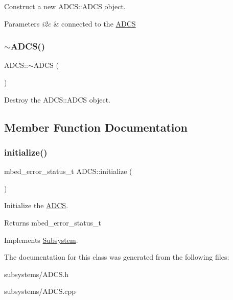 Construct a new A\+D\+C\+S\+::\+A\+D\+CS object. 


\begin{DoxyParams}{Parameters}
{\em i2c} & connected to the \mbox{\hyperlink{class_a_d_c_s}{A\+D\+CS}} \\
\hline
\end{DoxyParams}
\mbox{\label{class_a_d_c_s_a64926eda19fc2e58876c62616ab0b068}} 
\subsubsection{\texorpdfstring{$\sim$ADCS()}{~ADCS()}}
{\footnotesize\ttfamily A\+D\+C\+S\+::$\sim$\+A\+D\+CS (\begin{DoxyParamCaption}{ }\end{DoxyParamCaption})}



Destroy the A\+D\+C\+S\+::\+A\+D\+CS object. 



\subsection{Member Function Documentation}
\mbox{\label{class_a_d_c_s_a5a4196a5298a2e804ee85f2965b31133}} 
\subsubsection{\texorpdfstring{initialize()}{initialize()}}
{\footnotesize\ttfamily mbed\+\_\+error\+\_\+status\+\_\+t A\+D\+C\+S\+::initialize (\begin{DoxyParamCaption}{ }\end{DoxyParamCaption})\hspace{0.3cm}{\ttfamily [virtual]}}



Initialize the \mbox{\hyperlink{class_a_d_c_s}{A\+D\+CS}}. 

\begin{DoxyReturn}{Returns}
mbed\+\_\+error\+\_\+status\+\_\+t 
\end{DoxyReturn}


Implements \mbox{\hyperlink{class_subsystem_afa43e7c1c8b49e514b944f517d4dc905}{Subsystem}}.



The documentation for this class was generated from the following files\+:\begin{DoxyCompactItemize}
\item 
subsystems/A\+D\+C\+S.\+h\item 
subsystems/A\+D\+C\+S.\+cpp\end{DoxyCompactItemize}
